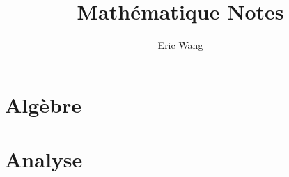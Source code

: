 \documentclass{book}
\begin{document}
\title{Math\'ematique Notes}
\author{Eric Wang}
\maketitle
\newpage
\tableofcontents
\newpage

\part{Alg\`ebre}









\part{Analyse}
\end{document}

